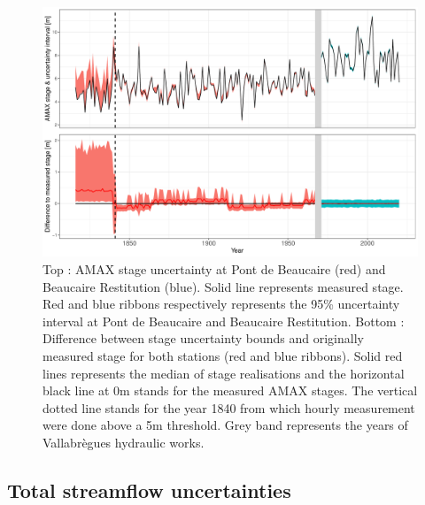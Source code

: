 \documentclass[11pt]{article}
\begin{document}
    \begin{figure}[h!]
        \centering
        \includegraphics[width=0.8\linewidth]{Figs/8-StageErrorAMAX_BOTH.pdf}\hfill
        \caption{Top : AMAX stage uncertainty at Pont de Beaucaire (red) and Beaucaire Restitution (blue). Solid line represents measured stage. Red and blue ribbons respectively represents the 95\% uncertainty interval at Pont de Beaucaire and Beaucaire Restitution.
        Bottom : Difference between stage uncertainty bounds and originally measured stage for both stations (red and blue ribbons). Solid red lines represents the median of stage realisations and the horizontal black line at 0m stands for the measured AMAX stages. The vertical dotted line stands for the year 1840 from which hourly measurement were done above a 5m threshold. Grey band represents the years of Vallabrègues hydraulic works.}
        \label{fig:StageErrAMAX}
    \end{figure}
  

    \subsection{Total streamflow uncertainties}
    
\end{document}
